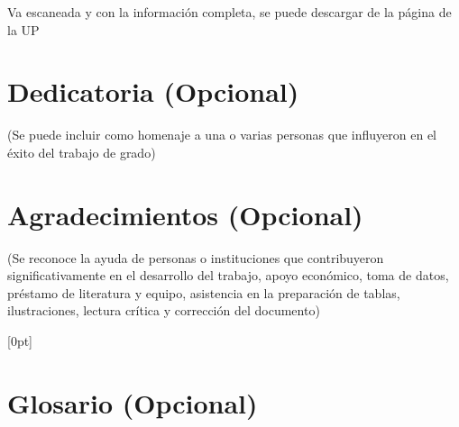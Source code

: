 \documentclass[11pt,openany]{book}
\renewcommand{\headrulewidth}{0pt}
\renewcommand{\headrulewidth}{0pt}%
\renewcommand{\footrulewidth}{0pt}%
\begin{document}
Va escaneada y con la información completa, se puede descargar de la página de la UP

\newpage

\chapter*{Dedicatoria (Opcional)}

\begin{center}
    (Se puede incluir como homenaje a una o varias personas que influyeron en el éxito del trabajo de grado)
\end{center}

\newpage

\chapter*{Agradecimientos (Opcional)}

\begin{center}
    (Se reconoce la ayuda de personas o instituciones que contribuyeron significativamente en el desarrollo del trabajo, apoyo económico, toma de datos, préstamo de literatura y equipo, asistencia en la preparación de tablas, ilustraciones, lectura crítica y corrección del documento)
\end{center}

\newpage



\renewcommand{\contentsname}{Índice de Contenido}
\doublespacing
{}[0pt]{\addvspace{1pc}\bfseries}{}{}{\hfill\contentspage}
\tableofcontents
\singlespacing

\newpage

\thispagestyle{plain}

\doublespacing
\renewcommand{\listfigurename}{Índice de Figuras}
\listoffigures
\singlespacing

\newpage

\thispagestyle{plain}

\doublespacing
\renewcommand{\listtablename}{Índice de tablas}
\renewcommand{\tablename}{Tabla}
\listoftables
\singlespacing

\newpage

\chapter*{Glosario (Opcional)}

\thispagestyle{fancy}
\fancyhf{}
   \chead{} \rhead{\thepage}
    \lfoot{}{} \cfoot{} \rfoot{}
    \renewcommand{\headrulewidth}{0pt}
  \renewcommand{\footrulewidth}{0pt}
\end{document}
